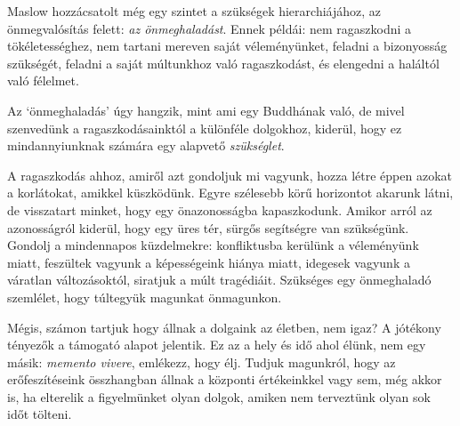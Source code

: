 Maslow hozzácsatolt még egy szintet a szükségek hierarchiájához, az
önmegvalósítás felett: \emph{az önmeghaladást}. Ennek példái: nem
ragaszkodni a tökéletességhez, nem tartani mereven saját véleményünket,
feladni a bizonyosság szükségét, feladni a saját múltunkhoz való
ragaszkodást, és elengedni a haláltól való félelmet.

Az `önmeghaladás' úgy hangzik, mint ami egy Buddhának való, de mivel
szenvedünk a ragaszkodásainktól a különféle dolgokhoz, kiderül, hogy ez
mindannyiunknak számára egy alapvető \emph{szükséglet}.

A ragaszkodás ahhoz, amiről azt gondoljuk mi vagyunk, hozza létre éppen
azokat a korlátokat, amikkel küszködünk. Egyre szélesebb körű horizontot
akarunk látni, de visszatart minket, hogy egy önazonosságba
kapaszkodunk. Amikor arról az azonosságról kiderül, hogy egy üres tér,
sürgős segítségre van szükségünk. Gondolj a mindennapos küzdelmekre:
konfliktusba kerülünk a véleményünk miatt, feszültek vagyunk a
képességeink hiánya miatt, idegesek vagyunk a váratlan változásoktól,
siratjuk a múlt tragédiáit. Szükséges egy önmeghaladó szemlélet, hogy
túltegyük magunkat önmagunkon.

Mégis, számon tartjuk hogy állnak a dolgaink az életben, nem igaz? A
jótékony tényezők a támogató alapot jelentik. Ez az a hely és idő ahol
élünk, nem egy másik: \emph{memento vivere}, emlékezz, hogy élj. Tudjuk
magunkról, hogy az erőfeszítéseink összhangban állnak a központi
értékeinkkel vagy sem, még akkor is, ha elterelik a figyelmünket olyan
dolgok, amiken nem terveztünk olyan sok időt tölteni.

\clearpage
\figurepagelayout

